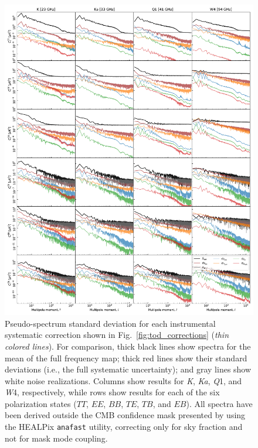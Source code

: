 \documentclass[twocolumn]{../../common/aa}
\newcommand{\K}[0]{\textit K}
\newcommand{\Ka}[0]{\textit{Ka}}
\newcommand{\Q}[0]{\textit Q}
\newcommand{\W}[0]{\textit W}
\begin{document}
\begin{figure}
  \center	
   \includegraphics[width=0.95\linewidth]{figures/components_power_spectrum_std_masked_WMAP_new_rms.pdf}
  \caption{Pseudo-spectrum standard deviation for each instrumental
    systematic correction shown in
    Fig.~\ref{fig:tod_corrections} (\emph{thin
      colored lines}). For comparison, thick black lines show spectra
    for the mean of the full frequency map; thick red lines show their standard deviations (i.e., the full systematic uncertainty); and gray lines show white noise realizations.
    Columns show results for \K,
    \Ka, \Q1, and \W4, respectively, while rows show results for each of
    the six polarization states ($TT$, $EE$, $BB$, $TE$, $TB$, and
    $EB$). All spectra have been derived outside the CMB confidence
    mask presented by \citet{bp13} using the HEALPix \texttt{anafast}
    utility, correcting only for sky fraction and not for mask mode
    coupling. }
  \label{fig:corrmap_stddev}
\end{figure}
\end{document}
